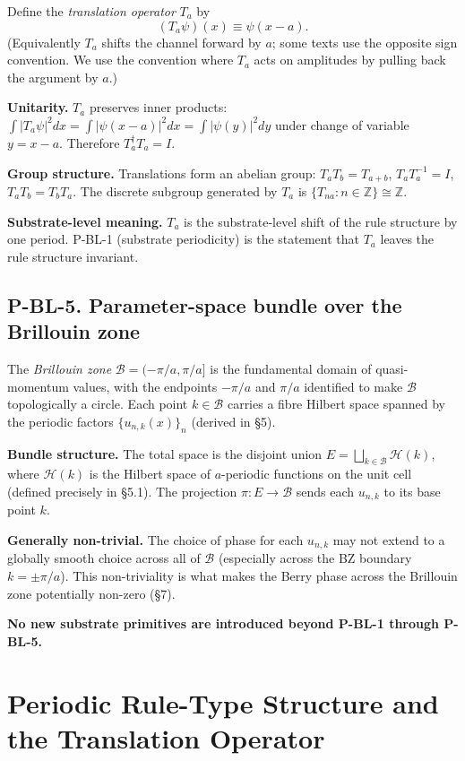 \documentclass[11pt,a4paper]{article}
\begin{document}
Define the \emph{translation operator} $T_a$ by
\[
(T_a \psi)(x) \equiv \psi(x - a).
\]
(Equivalently $T_a$ shifts the channel forward by $a$; some texts use the opposite sign convention. We use the convention where $T_a$ acts on amplitudes by pulling back the argument by $a$.)

\textbf{Unitarity.} $T_a$ preserves inner products: $\int|T_a\psi|^2 dx = \int|\psi(x-a)|^2 dx = \int|\psi(y)|^2 dy$ under change of variable $y = x - a$. Therefore $T_a^\dagger T_a = I$.

\textbf{Group structure.} Translations form an abelian group: $T_a T_b = T_{a+b}$, $T_a T_a^{-1} = I$, $T_a T_b = T_b T_a$. The discrete subgroup generated by $T_a$ is $\{T_{na} : n \in \mathbb{Z}\} \cong \mathbb{Z}$.

\textbf{Substrate-level meaning.} $T_a$ is the substrate-level shift of the rule structure by one period. P-BL-1 (substrate periodicity) is the statement that $T_a$ leaves the rule structure invariant.

\subsection{P-BL-5. Parameter-space bundle over the Brillouin zone}

The \emph{Brillouin zone} $\mathcal{B} = (-\pi/a, \pi/a]$ is the fundamental domain of quasi-momentum values, with the endpoints $-\pi/a$ and $\pi/a$ identified to make $\mathcal{B}$ topologically a circle. Each point $k \in \mathcal{B}$ carries a fibre Hilbert space spanned by the periodic factors $\{u_{n,k}(x)\}_n$ (derived in \S5).

\textbf{Bundle structure.} The total space is the disjoint union $E = \bigsqcup_{k \in \mathcal{B}} \mathcal{H}(k)$, where $\mathcal{H}(k)$ is the Hilbert space of $a$-periodic functions on the unit cell (defined precisely in \S5.1). The projection $\pi: E \to \mathcal{B}$ sends each $u_{n,k}$ to its base point $k$.

\textbf{Generally non-trivial.} The choice of phase for each $u_{n,k}$ may not extend to a globally smooth choice across all of $\mathcal{B}$ (especially across the BZ boundary $k = \pm\pi/a$). This non-triviality is what makes the Berry phase across the Brillouin zone potentially non-zero (\S7).

\textbf{No new substrate primitives are introduced beyond P-BL-1 through P-BL-5.}

\section{Periodic Rule-Type Structure and the Translation Operator}
\end{document}
